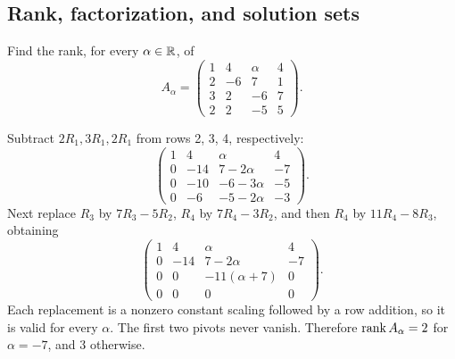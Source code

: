 \subsection*{Rank, factorization, and solution sets}

\begin{problem}\label{ex:03:parameter-rank}
Find the rank, for every \(\alpha\in\mathbb R\), of
\[
A_\alpha=\begin{pmatrix}1&4&\alpha&4\\2&-6&7&1\\3&2&-6&7\\2&2&-5&5\end{pmatrix}.
\]
\end{problem}
\begin{solution}
Subtract \(2R_1,3R_1,2R_1\) from rows 2, 3, 4, respectively:
\[
\begin{pmatrix}
1&4&\alpha&4\\0&-14&7-2\alpha&-7\\
0&-10&-6-3\alpha&-5\\0&-6&-5-2\alpha&-3
\end{pmatrix}.
\]
Next replace \(R_3\) by \(7R_3-5R_2\), \(R_4\) by \(7R_4-3R_2\),
and then \(R_4\) by \(11R_4-8R_3\), obtaining
\[
\begin{pmatrix}
1&4&\alpha&4\\0&-14&7-2\alpha&-7\\
0&0&-11(\alpha+7)&0\\0&0&0&0
\end{pmatrix}.
\]
Each replacement is a nonzero constant scaling followed by a row addition,
so it is valid for every \(\alpha\). The first two pivots never vanish.
Therefore \(\operatorname{rank} A_\alpha=2\) for \(\alpha=-7\), and 3 otherwise.
\end{solution}

